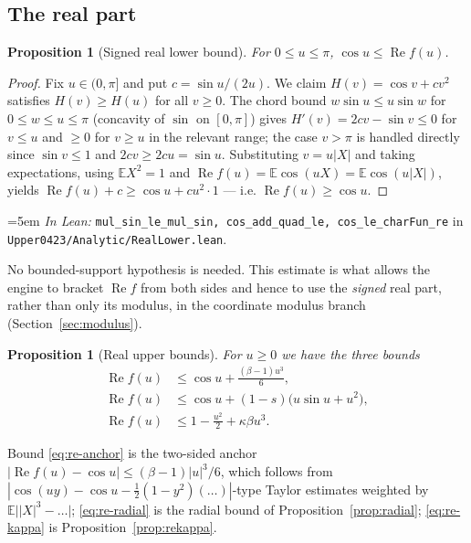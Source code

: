 \documentclass[11pt,a4paper]{article}
\newtheorem{proposition}[theorem]{Proposition}
\theoremstyle{definition}
\newcommand{\EE}{\mathbb{E}}
\newcommand{\kap}{\kappa}
\newcommand{\Lean}[1]{\texttt{#1}}
\newcommand{\file}[1]{\texttt{#1}}
\newcommand{\formal}[2]{%
  \par\smallskip
  \begingroup\small\raggedright\emergencystretch=5em
  \noindent\textit{In Lean:} \Lean{#1} in \file{#2}.\par
  \endgroup\smallskip}
\begin{document}
\subsection{The real part}

\begin{proposition}[Signed real lower bound]
  \label{prop:relower}
  For $0\le u\le\pi$, $\cos u\le\operatorname{Re}f(u)$.
\end{proposition}

\begin{proof}
  Fix $u\in(0,\pi]$ and put $c=\sin u/(2u)$. We claim
  $H(v)=\cos v+cv^2$ satisfies $H(v)\ge H(u)$ for all $v\ge0$. The chord bound
  $w\sin u\le u\sin w$ for $0\le w\le u\le\pi$ (concavity of $\sin$ on $[0,\pi]$)
  gives $H'(v)=2cv-\sin v\le 0$ for $v\le u$ and $\ge0$ for $v\ge u$ in the
  relevant range; the case $v>\pi$ is handled directly since $\sin v\le 1$ and
  $2cv\ge 2cu=\sin u$. Substituting $v=u|X|$ and taking expectations, using
  $\EE X^2=1$ and $\operatorname{Re}f(u)=\EE\cos(uX)=\EE\cos(u|X|)$, yields
  $\operatorname{Re}f(u)+c\ge\cos u+cu^2\cdot 1$ --- i.e.
  $\operatorname{Re}f(u)\ge\cos u$.
\end{proof}
\formal{mul\_sin\_le\_mul\_sin, cos\_add\_quad\_le, cos\_le\_charFun\_re}{Upper0423/Analytic/RealLower.lean}

No bounded-support hypothesis is needed. This estimate is what allows the engine
to bracket $\operatorname{Re}f$ from both sides and hence to use the
\emph{signed} real part, rather than only its modulus, in the coordinate modulus
branch (Section~\ref{sec:modulus}).

\begin{proposition}[Real upper bounds]
  \label{prop:reupper}
  For $u\ge0$ we have the three bounds
  \begin{align}
    \operatorname{Re}f(u)&\le \cos u+\frac{(\beta-1)u^3}{6},
      \label{eq:re-anchor}\\
    \operatorname{Re}f(u)&\le \cos u+(1-s)\bigl(u\sin u+u^2\bigr),
      \label{eq:re-radial}\\
    \operatorname{Re}f(u)&\le 1-\frac{u^2}{2}+\kap\beta u^3 .
      \label{eq:re-kappa}
  \end{align}
\end{proposition}

Bound \eqref{eq:re-anchor} is the two-sided anchor
$|\operatorname{Re}f(u)-\cos u|\le(\beta-1)|u|^3/6$, which follows from
$|\cos(uy)-\cos u-\tfrac12(1-y^2)(\ldots)|$-type Taylor estimates weighted by
$\EE\bigl||X|^3-\ldots\bigr|$; \eqref{eq:re-radial} is the radial bound of
Proposition~\ref{prop:radial}; \eqref{eq:re-kappa} is
Proposition~\ref{prop:rekappa}.
\end{document}

